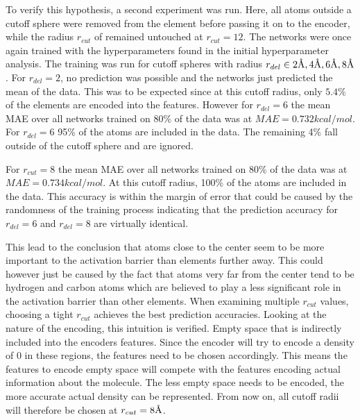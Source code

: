To verify this hypothesis, a second experiment was run.
Here, all atoms outside a cutoff sphere were removed from the element before passing it on to the encoder,
while the radius $r_{cut}$ of remained untouched at $r_{cut}=12$.
The networks were once again trained with the hyperparameters found in the initial hyperparameter analysis.
The training was run for cutoff spheres with radius $r_{del} \in 2\AA, 4\AA, 6\AA, 8\AA$.
For $r_{del}=2$, no prediction was possible and the networks just predicted the mean of the data.
This was to be expected since at this cutoff radius, only $5.4\%$ of the elements are encoded into the features.
However for $r_{del}=6$ the mean MAE over all networks trained on 80\% of the data was at $MAE = 0.732 kcal/mol$. 
For $r_{del} = 6$ 95\% of the atoms are included in the data. 
The remaining 4\% fall outside of the cutoff sphere and are ignored. 

For $r_{cut}=8$ the mean MAE over all networks trained on 80\% of the data was at $MAE = 0.734 kcal/mol$. 
At this cutoff radius, 100\% of the atoms are included in the data.
This accuracy is within the margin of error that could be caused by the randomness of the training process
indicating that the prediction accuracy for $r_{del} = 6$ and $r_{del} = 8$ are virtually identical.

This lead to the conclusion that atoms close to the center seem to be more important to the activation barrier than 
elements further away.
This could however just be caused by the fact that atoms very far from the center tend to be hydrogen and carbon 
atoms which are believed to play a less significant role in the activation barrier than other elements.
When examining multiple $r_{cut}$ values, choosing a tight $r_{cut}$ achieves the best prediction accuracies.
Looking at the nature of the encoding, this intuition is verified.
Empty space that is indirectly included into the encoders features.
Since the encoder will try to encode a density of 0 in these regions,
the features need to be chosen accordingly.
This means the features to encode empty space will compete with the features encoding
actual information about the molecule.
The less empty space needs to be encoded, the more accurate actual density can be represented.
From now on, all cutoff radii will therefore be chosen at $r_{cut} = 8 \AA$.

